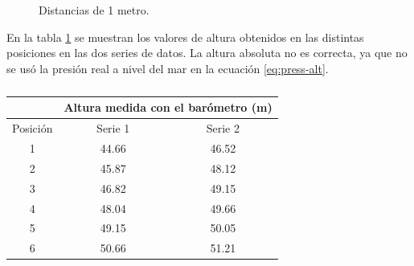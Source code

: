\documentclass[main]{subfiles}
\begin{document}
\begin{figure}[H]
\hspace{-10pt}
\centering
  \caption{Distancias de 1 metro.}
\label{fig:1m}
\end{figure}

En la tabla \ref{tab:alturasm} se muestran los valores de altura obtenidos en las distintas posiciones en las dos series de datos. La altura absoluta no es correcta, ya que no se us\'o la presi\'on real a nivel del mar en la ecuaci\'on \ref{eq:press-alt}.

\begin{table}
\vspace{-15pt}
\begin{tabular}{c|c|c|} 
	& \multicolumn{2}{|p{100pt}|}{\cellcolor[gray]{0.8} Altura medida con el bar\'ometro (m)}      \\ \hline
\cellcolor[gray]{0.8} {Posici\'on} & \cellcolor[gray]{0.8} {Serie 1} &\cellcolor[gray]{0.8} {Serie 2}\\ \hline

\multicolumn{1}{|c|}{1} & 44.66 & 46.52 \\ \hline
\multicolumn{1}{|c|}{2} & 45.87 & 48.12\\ \hline
\multicolumn{1}{|c|}{3} & 46.82 & 49.15\\ \hline
\multicolumn{1}{|c|}{4} & 48.04 & 49.66\\ \hline
\multicolumn{1}{|c|}{5} & 49.15 & 50.05\\ \hline
\multicolumn{1}{|c|}{6} & 50.66 & 51.21 \\ \hline

\end{tabular}
\caption{}
\label{tab:alturasm}
\end{table}
\end{document}
